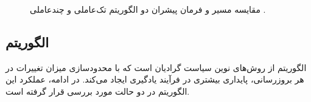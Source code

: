 \begin{figure}[H]
	\centering
	
	
	\caption{
	مقایسه مسیر و فرمان پیشران دو الگوریتم تک‌عاملی و چندعاملی .
	}
\end{figure}


\subsection{الگوریتم }

الگوریتم   از روش‌های نوین سیاست گرادیان است که با محدودسازی میزان تغییرات در هر بروزرسانی، پایداری بیشتری در فرآیند یادگیری ایجاد می‌کند. در ادامه، عملکرد این الگوریتم در دو حالت مورد بررسی قرار گرفته است.


